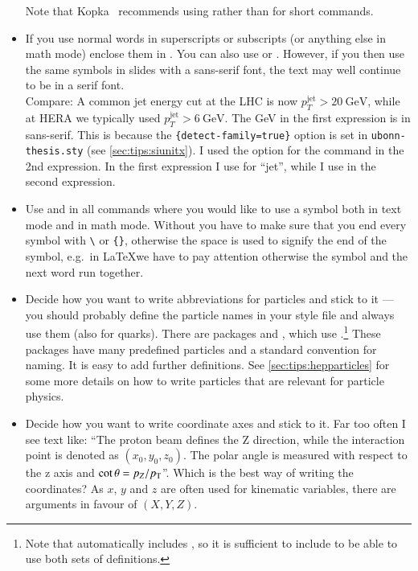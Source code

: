 \begin{itemize}
  Note that Kopka~\cite{kopka04}
  recommends using  rather than 
  for short commands.

\item If you use normal words in superscripts or subscripts (or
  anything else in math mode) enclose them in . You can
  also use  or . However, if you then use
  the same symbols in slides with a sans-serif font, the text may well
  continue to be in a
  serif font.\\
  {\sffamily Compare: A common jet energy cut at the LHC is now
    \(p_{T}^{\text{jet}} > \SI{20}{\GeV}\), while at HERA we typically
    used \(p_{T}^{\mathrm{jet}} > \SI[detect-family=false]{6}{\GeV}\).
  }
  The \si{\GeV} in the first expression is in sans-serif. This is
  because the
  \texttt{\{detect-family=true\}}
  option is set in \texttt{ubonn-thesis.sty}
  (see \cref{sec:tips:siunitx}).  I used the option
  for the  command in the 2nd expression.
  In the first expression I use  for \enquote{jet}, while
  I use  in the second expression.

\item Use  and
   in all commands where you would
  like to use a symbol both in text mode and in math mode. Without
   you have to make sure that you end every symbol with
  \texttt{\textbackslash} or \texttt{\{\}}, otherwise the space is used
  to signify the end of the symbol, e.g.\ in \LaTeX we have to pay
  attention otherwise the symbol and the next word run together.

\item Decide how you want to write abbreviations for particles and
  stick to it --- you should probably define the particle names in your
  style file and always use them (also for quarks).
  There are packages  and ,
  which use .\footnote{%
    Note that  automatically includes ,
    so it is sufficient to include  to be able to use both sets of definitions.}
  These packages have many predefined particles and a standard convention for naming.
  It is easy to add further definitions.
  See \cref{sec:tips:hepparticles} for some more details on how to write particles
  that are relevant for particle physics.

\item Decide how you want to write coordinate axes
  and stick to it. Far too often I see text like: \enquote{The proton
    beam defines the Z direction, while the interaction point is
    denoted as \((x_{0}, y_{0}, z_{0})\). The polar angle is measured
    with respect to the z axis and \(\cot\theta = p_{Z}/p_{\text{T}}\)}. Which is
  the best way of writing the coordinates? As \(x\), \(y\) and \(z\) are
  often used for kinematic variables, there are arguments in favour of
  \((X, Y, Z)\).


\end{itemize}
